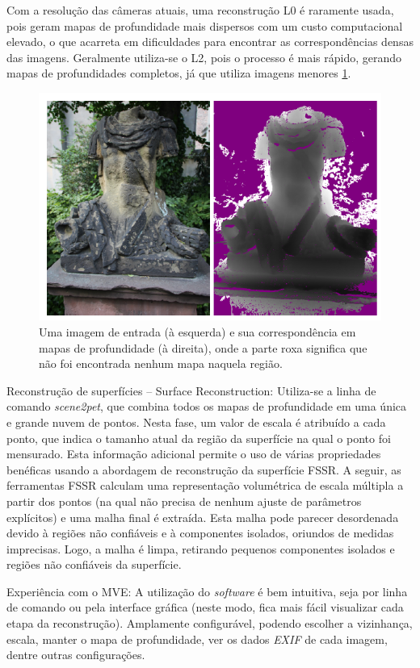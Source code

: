 Com a resolução das câmeras atuais, uma reconstrução L0 é raramente usada, pois geram mapas de profundidade mais dispersos com um custo computacional elevado, o que acarreta em dificuldades para encontrar as correspondências densas das imagens. Geralmente utiliza-se o L2, pois o processo é mais rápido, gerando mapas de profundidades completos, já que utiliza imagens menores \ref{fig:mvedepth}.

\begin{figure}[!h]
	\centering
	\includegraphics[width=0.5\linewidth]{figs/mvedepth.png}
	\caption{%
	Uma imagem de entrada (à esquerda) e sua correspondência em mapas de profundidade (à direita), onde a parte roxa significa que não foi encontrada nenhum mapa naquela região.%
	}\label{fig:mvedepth}
\end{figure}


Reconstrução de superfícies -- {Surface Reconstruction}: Utiliza-se a linha de comando {\it scene2pet}, que combina todos os mapas de profundidade em uma única e grande nuvem de pontos. Nesta fase, um valor de escala é atribuído a cada ponto, que indica o tamanho atual da região da superfície na qual o ponto foi mensurado. Esta informação adicional permite o uso de várias propriedades benéficas usando a abordagem de reconstrução da superfície FSSR. %
A seguir, as ferramentas FSSR calculam uma representação volumétrica de escala múltipla a partir dos pontos (na qual não precisa de nenhum ajuste de parâmetros explícitos) e uma malha final é extraída. Esta malha pode parecer desordenada devido à regiões não confiáveis e à componentes isolados, oriundos de medidas imprecisas. Logo, a malha é limpa, retirando pequenos componentes isolados e regiões não confiáveis da superfície. 


Experiência com o MVE: A utilização do {\it software} é bem intuitiva, seja por linha de comando ou pela interface gráfica (neste modo, fica mais fácil visualizar cada etapa da reconstrução). Amplamente configurável, podendo escolher a vizinhança, escala, manter o mapa de profundidade, ver os dados {\it EXIF} de cada imagem, dentre outras configurações.


